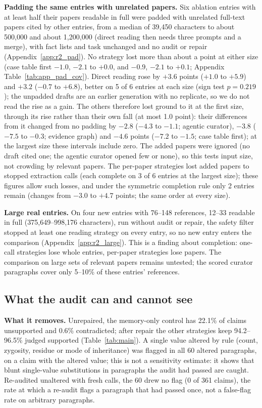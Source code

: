 \documentclass{article} %
\begin{document}
\textbf{Padding the same entries with unrelated papers.}\label{sec:size} Six ablation entries with at least half their papers readable in full were padded with unrelated full-text papers cited by other entries, from a median of 39,450 characters to about 500,000 and about 1,200,000 (direct reading then needs three prompts and a merge), with fact lists and task unchanged and no audit or repair (Appendix~\ref{app:r2_pad}). No strategy lost more than about a point at either size (case table first $-1.0$, $-2.1$ to $+0.0$, and $-0.9$, $-2.1$ to $+0.1$; Appendix Table~\ref{tab:app_pad_cov}). Direct reading rose by $+3.6$ points ($+1.0$ to $+5.9$) and $+3.2$ ($-0.7$ to $+6.8$), better on 5 of 6 entries at each size (sign test $p=0.219$); the unpadded drafts are an earlier generation with no replicate, so we do not read the rise as a gain. The others therefore lost ground to it at the first size, through its rise rather than their own fall (at most 1.0 point): their differences from it changed from no padding by $-2.8$ ($-4.3$ to $-1.1$; agentic curator), $-3.8$ ($-7.5$ to $-0.3$; evidence graph) and $-4.6$ points ($-7.2$ to $-1.5$; case table first); at the largest size these intervals include zero. The added papers were ignored (no draft cited one; the agentic curator opened few or none), so this tests input size, not crowding by relevant papers. The per-paper strategies lost added papers to stopped extraction calls (each complete on 3 of 6 entries at the largest size); these figures allow such losses, and under the symmetric completion rule only 2 entries remain (changes from $-3.0$ to $+4.7$ points; the same order at every size).

\textbf{Large real entries.} On four new entries with 76--148 references, 12--33 readable in full (375,649--998,176 characters), run without audit or repair, the safety filter stopped at least one reading strategy on every entry, so no new entry enters the comparison (Appendix~\ref{app:r2_large}). This is a finding about completion: one-call strategies lose whole entries, per-paper strategies lose papers. The comparison on large sets of relevant papers remains untested; the scored curator paragraphs cover only 5--10\% of these entries' references.

\subsection{What the audit can and cannot see}
\label{sec:audit}
\textbf{What it removes.} Unrepaired, the memory-only control has 22.1\% of claims unsupported and 0.6\% contradicted; after repair the other strategies keep 94.2--96.5\% judged supported (Table~\ref{tab:main}). A single value altered by rule (count, zygosity, residue or mode of inheritance) was flagged in all 60 altered paragraphs, on a claim with the altered value; this is not a sensitivity estimate: it shows that blunt single-value substitutions in paragraphs the audit had passed are caught. Re-audited unaltered with fresh calls, the 60 drew no flag (0 of 361 claims), the rate at which a re-audit flags a paragraph that had passed once, not a false-flag rate on arbitrary paragraphs.
\end{document}
